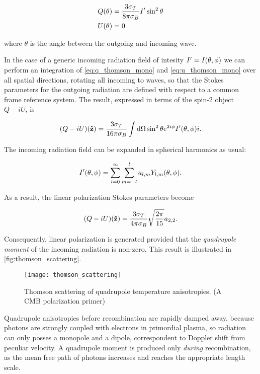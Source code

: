 \begin{align}
        Q\qty(\theta) & = \frac{3\sigma_T}{8\pi\sigma_B}I'\sin^2\theta
        \label{eq:q_thomson_mono} \\
        U\qty(\theta) & = 0 \label{eq:u_thomson_mono}
\end{align}

where $\theta$ is the angle between the outgoing and incoming wave.

In the case of a generic incoming radiation field of intesity $I' =
I\qty(\theta,\phi)$ we can perform an integration of
\autoref{eq:q_thomson_mono} and \autoref{eq:u_thomson_mono} over all
spatial directions, rotating all incoming to waves, so that the Stokes
parameters for the outgoing radiation are defined with respect to a common
frame reference system. The result, expressed in terms of the spin-2 object
$Q - iU$, is

\begin{equation}
        (Q -iU)\qty(\vectorunit{z}) = \frac{3\sigma_T}{16\pi \sigma_B}
        \int \dd{\Omega} \sin^2\theta e^{2i\phi}I'\qty(\theta,\phi)i.
\end{equation}

The incoming radiation field can be expanded in spherical harmonics as
usual:

\begin{equation}
        I'\qty(\theta,\phi) = \sum^\infty_{l = 0}\sum^l_{m = -l}
        a_{l,m} Y_{l,m}\qty(\theta,\phi).
\end{equation}

As a result, the linear polarization Stokes parameters become

\begin{equation}
        (Q - iU)\qty(\vectorunit{z}) = \frac{3\sigma_T}{4\pi\sigma_B}
        \sqrt{\frac{2\pi}{15}} a_{2,2}.
\end{equation}

Consequently, linear polarization is generated provided that the \emph{quadrupole
moment} of the incoming radiation is non-zero. This result is illustrated
in \autoref{fig:thomson_scattering}.

\begin{figure}
        \centering
        \texttt{[image: thomson\_scattering]}
        \caption{Thomson scattering of quadrupole temperature anisotropies.
        (A CMB polarization primer)}
        \label{fig:thomson_scattering}
\end{figure}

Quadrupole anisotropies before recombination are rapidly damped away,
because photons are strongly coupled with electrons in primordial plasma, so
radiation can only posses a monopole and a dipole, correspondent to Doppler
shift from peculiar velocity. A quadrupole moment is produced only
\emph{during} recombination, as the mean free path of photons increases and
reaches the appropriate length scale.

